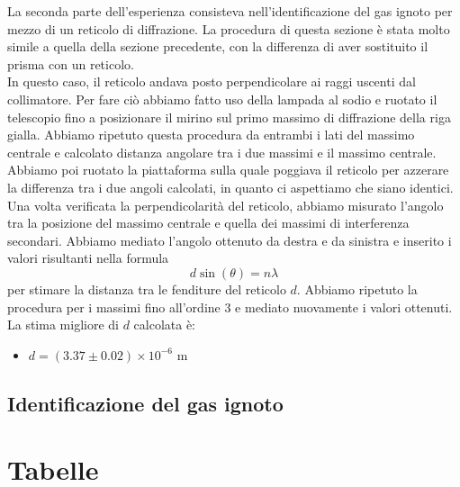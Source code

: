 \documentclass[letterpaper,12pt]{article}
\begin{document}
La seconda parte dell'esperienza consisteva nell'identificazione del gas ignoto per mezzo di un reticolo di diffrazione.
La procedura di questa sezione è stata molto simile a quella della sezione precedente, con la differenza di aver sostituito
il prisma con un reticolo. \\
In questo caso, il reticolo andava posto perpendicolare ai raggi uscenti dal collimatore. Per fare ciò abbiamo fatto uso della lampada
al sodio e ruotato il telescopio fino a posizionare il mirino sul primo massimo di diffrazione della riga gialla.
Abbiamo ripetuto questa procedura da entrambi i lati del massimo centrale e calcolato distanza angolare tra i due massimi e il massimo centrale.
Abbiamo poi ruotato la piattaforma sulla quale poggiava il reticolo per azzerare la differenza tra i due angoli calcolati, in quanto ci aspettiamo che siano identici.\\

Una volta verificata la perpendicolarità del reticolo, abbiamo misurato l'angolo tra la posizione del massimo centrale e quella dei massimi di
interferenza secondari. Abbiamo mediato l'angolo ottenuto da destra e da sinistra e inserito i valori risultanti nella formula
\begin{equation}
    d \sin(\theta) = n \lambda
    \label{eq:reticolo}
\end{equation}
per stimare la distanza tra le fenditure del reticolo $d$. Abbiamo ripetuto la procedura per i massimi fino all'ordine 3 e mediato nuovamente
i valori ottenuti. \\
La stima migliore di $d$ calcolata è:
\begin{itemize}
    \item $d = (3.37 \pm 0.02)\times10^{-6}$ m
\end{itemize}

\subsection{Identificazione del gas ignoto}

\newpage
\section{Tabelle}
\end{document}

